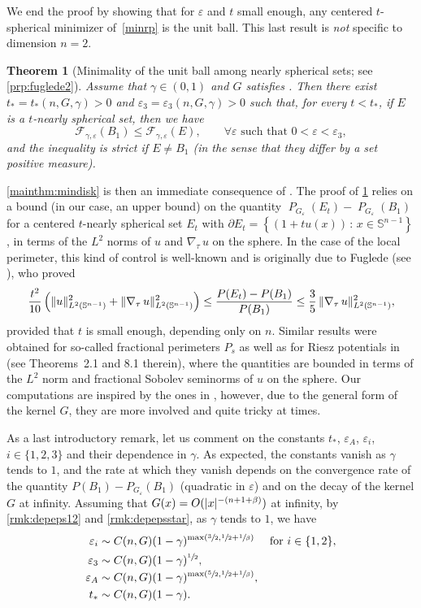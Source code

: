 \documentclass[JEP,XML,SOM,Unicode,published]{cedram}
\newcommand{\sep}{\,:\,}
\numberwithin{equation}{section}
\theoremstyle{plain}
\newtheorem{mainthm}{Theorem}
\theoremstyle{definition}
\newcommand{\bbS}{\mathbb{S}}
\newcommand{\calF}{{\mathcal{F}}}
\let\eps\varepsilon
\newcommand{\grad}{\nabla}
\DeclareMathOperator{\Per}{\mathit{P}}
\DeclarePairedDelimiter{\abs}{\lvert}{\rvert}
\DeclarePairedDelimiter{\norm}{\lVert}{\rVert}
\begin{document}
We end the proof by showing that for $\eps$ and $t$ small enough, any centered $t$-spherical
minimizer of~\cref{minrp} is the unit ball. This last result is \emph{not} specific to dimension
$n=2$.

\begin{mainthm}[Minimality of the unit ball among nearly spherical sets;
see {\cref{prp:fuglede2}}]\label{mainthm:minballsph}
Assume that $\gamma\in(0,1)$ and $G$ satisfies . Then there exist
$t_*=t_*(n,G,\gamma)>0$ and $\eps_3=\eps_3(n,G,\gamma)>0$ such that, for every
$t<t_*$, if $E$ is a $t$-nearly spherical set, then we have
\[
\calF_{\gamma,\eps}(B_1)\leq \calF_{\gamma,\eps}(E),\qquad\forall\eps\text{ such that } 0<\eps<\eps_3,
\]
and the inequality is strict if $E\neq B_1$ (in the sense that they differ by a set positive
measure).
\end{mainthm}

\cref{mainthm:mindisk} is then an immediate consequence of
.
The proof of \cref{mainthm:minballsph} relies on a bound (in our case, an upper bound) on the
quantity $\Per_{G_\eps}(E_t)-\Per_{G_\eps}(B_1)$ for a centered $t$-nearly spherical set $E_t$ with
$\partial E_t=\left\{(1+tu(x))\sep x\in\bbS^{n-1}\right\}$, in terms of the $L^2$ norms of $u$ and
$\grad_\tau\, u$ on the sphere. In the case of the local perimeter, this kind of control is
well-known and is originally due to Fuglede (see \cite[Th.\,1.2]{Fug1989}), who
proved
\[
\frac{t^2}{10}\left(\norm{u}_{L^2(\bbS^{n-1})}^2+\norm{\grad_\tau\, u}^2_{L^2(\bbS^{n-1})}\right)
\leq \frac{P(E_t)-P(B_1)}{P(B_1)}\leq
\frac{3}{5}\,\norm{\grad_\tau\,u}^2_{L^2(\bbS^{n-1})},
\]
provided that $t$ is small enough, depending only on $n$.
Similar results were obtained for so-called fractional perimeters $P_s$ as well as for Riesz
potentials in \cite{FFM+2015} (see Theorems~2.1 and 8.1 therein), where the quantities are
bounded in terms of the $L^2$ norm and fractional Sobolev seminorms of $u$ on the sphere. Our
computations are inspired by the ones in \cite{FFM+2015}, however, due to the general form of
the kernel $G$, they are more involved and quite tricky at times.

As a last introductory remark, let us comment on the constants $t_*$, $\eps_A$, $\eps_i$,
\hbox{$i\in\{1,2,3\}$} and their dependence in $\gamma$.
As expected, the constants vanish as $\gamma$ tends to $1$, and the rate at which they vanish
depends on the convergence rate of the quantity $P(B_1)-P_{G_\eps}(B_1)$ (quadratic in $\eps$) and
on the decay of the kernel $G$ at infinity. Assuming that $G(x)=O(\abs{x}^{-(n+1+\beta)})$ at
infinity, by \cref{rmk:depeps12} and \cref{rmk:depepsstar}, as $\gamma$ tends to $1$, we have
\[
\begin{aligned}
\eps_i &\sim C(n,G)(1-\gamma)^{\max\left(\sfrac{3}{2},\sfrac{1}{2} +\sfrac{1}{\beta}\right)}\quad
\text{ for }i\in\{1,2\},\\
\eps_3&\sim C(n,G)(1-\gamma)^{\sfrac{1}{2}},\\
\eps_A&\sim C(n,G)(1-\gamma)^{\max\left(\sfrac{5}{2},\sfrac{1}{2}
+\sfrac{1}{\beta}\right)},\\
t_*& \sim C(n,G)(1-\gamma).
\end{aligned}
\]
\end{document}
